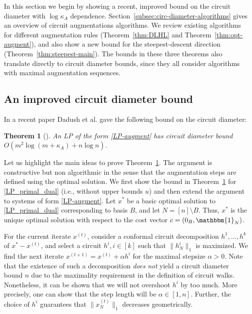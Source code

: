 \documentclass[11pt, a4paper]{article}
\newcommand{\1}{\mathbbm{1}}
\newtheorem{theorem}{Theorem}[section]
\theoremstyle{case}
\begin{document}
In this section we begin by showing a recent, improved bound on the circuit diameter with $\log \kappa_A$ dependence. Section~\ref{subsec:circ-diameter-algorithms} gives an overview of  circuit augmentations algorithms. We review existing algorithms for different augmentation rules (Theorem~\ref{thm:DLHL} and Theorem~\ref{thm:opt-augment}), and also show a new bound for the steepest-descent direction (Theorem~\ref{thm:steepest-main}). The bounds in these three theorems also translate directly to circuit diameter bounds, since they all consider algorithms with maximal augmentation sequences.

\subsection{An improved circuit diameter bound}

In a recent paper Dadush et al. \cite{dadush2021circuit} gave the following bound on the circuit diameter:

\begin{theorem}[\cite{dadush2021circuit}]\label{thm:diam-augment} An LP of the form \ref{LP-augment} has circuit diameter bound
$O(m^2 \log(m + \kappa_A) + n \log n)$.
\end{theorem}

Let us highlight the main ideas to prove Theorem~\ref{thm:diam-augment}. The argument is constructive but non algorithmic in the sense that the augmentation steps are defined using the optimal solution.
We first show the bound in Theorem~\ref{thm:diam-augment} for \ref{LP_primal_dual} (i.e., without upper bounds $u$) and then extend the argument to systems of form \ref{LP-augment}. Let $x^*$ be a basic optimal solution to \ref{LP_primal_dual} corresponding to basis $B$, and let $N = [n]\setminus B$. Thus, $x^*$ is the unique optimal solution with respect to the cost vector $c=(0_B,\1_N)$.

For the current iterate $x^{(t)}$, consider a conformal circuit decomposition $h^1, \ldots, h^k$ of $x^* - x^{(t)}$, and select a circuit $h^i, i \in [k]$ such that $\|h_N^i\|_1$ is maximized.
We find the next iterate $x^{(t+1)}=x^{(t)}+\alpha h^i$ for the maximal stepsize $\alpha>0$.
 Note that the existence of such a decomposition \emph{does not} yield a circuit diameter bound $n$ due to the maximality requirement in the definition of circuit walks. 
Nonetheless, it can be shown that we will not overshoot $h^i$ by too much. More precisely, one can show that the step length will be $\alpha\in [1,n]$. Further, the choice of $h^i$ guarantees that $\|x^{(t)}_N\|_1$ decreases geometrically.
\end{document}
